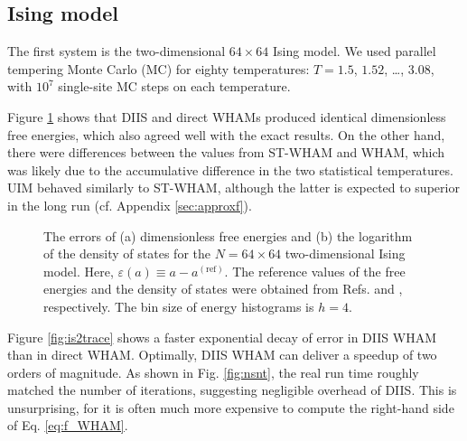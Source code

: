 \documentclass[reprint,aip,jcp,superscriptaddress]{revtex4-1}
\begin{document}
\subsection{\label{sec:results_Ising}
Ising model}





The first system is
the two-dimensional $64\times64$ Ising model.
%
We used parallel tempering\cite{
swendsen1986, *geyer1991, *hukushima1996, *hansmann1997,
*earl2005}
Monte Carlo (MC)
for
eighty temperatures: $T = 1.5$, $1.52$, \dots, $3.08$,
with $10^7$ single-site MC steps on each temperature.



Figure \ref{fig:is2ref} shows that
DIIS and direct WHAMs produced identical
dimensionless free energies, which also
agreed well with the exact results\cite{
ferdinand1969}.
%
On the other hand,
there were differences between
the values from ST-WHAM and WHAM,
which was likely due to
the accumulative difference
in the two statistical temperatures.
%
UIM behaved similarly to ST-WHAM,
although the latter is expected to superior
in the long run (cf. Appendix \ref{sec:approxf}).



\begin{figure}[h]
  \caption{
    \label{fig:is2ref}
    The errors of
    (a) dimensionless free energies and
    (b) the logarithm of the density of states
    for the $N = 64\times64$ two-dimensional Ising model.
    Here,
    $\varepsilon(a) \equiv a - a^\mathrm{(ref)}$.
    The reference values of the free energies and
    the density of states were obtained
    from Refs.  and ,
    respectively.
    The bin size of energy histograms is $h = 4$.
  }
\end{figure}




Figure \ref{fig:is2trace}
shows a faster exponential decay of error
in DIIS WHAM
than in direct WHAM.
%
Optimally, DIIS WHAM can
deliver a speedup of two orders of magnitude.
%
As shown in Fig. \ref{fig:nsnt},
the real run time roughly matched
the number of iterations,
suggesting negligible overhead of DIIS.
%
This is unsurprising,
for it is often much more expensive to compute
the right-hand side of Eq. \eqref{eq:f_WHAM}.
\end{document}
